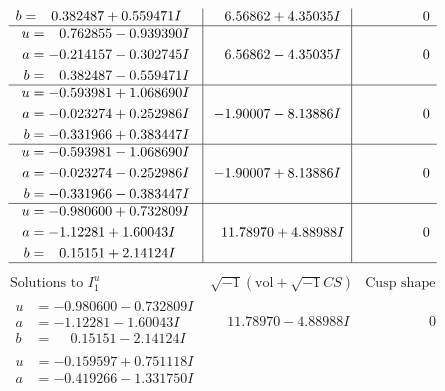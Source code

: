\documentclass[1p]{elsarticle_modified}
\theoremstyle{definition}
\newcommand{\I}{\sqrt{-1}}
\begin{document}
$$\begin{array}{c|c|c}
\begin{aligned}
b &= \phantom{-}0.382487 + 0.559471 I\end{aligned}
 & \phantom{-}6.56862 + 4.35035 I & \phantom{-0.000000 } 0 \\ \hline\begin{aligned}
u &= \phantom{-}0.762855 - 0.939390 I \\
a &= -0.214157 - 0.302745 I \\
b &= \phantom{-}0.382487 - 0.559471 I\end{aligned}
 & \phantom{-}6.56862 - 4.35035 I & \phantom{-0.000000 } 0 \\ \hline\begin{aligned}
u &= -0.593981 + 1.068690 I \\
a &= -0.023274 + 0.252986 I \\
b &= -0.331966 + 0.383447 I\end{aligned}
 & -1.90007 - 8.13886 I & \phantom{-0.000000 } 0 \\ \hline\begin{aligned}
u &= -0.593981 - 1.068690 I \\
a &= -0.023274 - 0.252986 I \\
b &= -0.331966 - 0.383447 I\end{aligned}
 & -1.90007 + 8.13886 I & \phantom{-0.000000 } 0 \\ \hline\begin{aligned}
u &= -0.980600 + 0.732809 I \\
a &= -1.12281 + 1.60043 I \\
b &= \phantom{-}0.15151 + 2.14124 I\end{aligned}
 & \phantom{-}11.78970 + 4.88988 I & \phantom{-0.000000 } 0\\
 \hline 
 \end{array}$$\newpage$$\begin{array}{c|c|c}  
\text{Solutions to }I^u_{1}& \I (\text{vol} + \sqrt{-1}CS) & \text{Cusp shape}\\
 \hline 
\begin{aligned}
u &= -0.980600 - 0.732809 I \\
a &= -1.12281 - 1.60043 I \\
b &= \phantom{-}0.15151 - 2.14124 I\end{aligned}
 & \phantom{-}11.78970 - 4.88988 I & \phantom{-0.000000 } 0 \\ \hline\begin{aligned}
u &= -0.159597 + 0.751118 I \\
a &= -0.419266 - 1.331750 I \\

\end{aligned}
\end{array}$$
\end{document}
